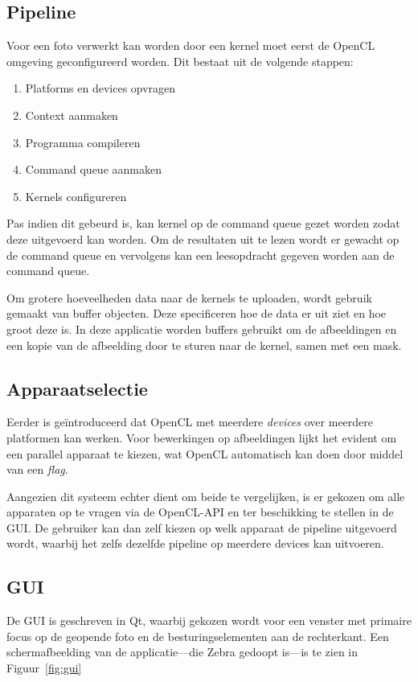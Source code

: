 \documentclass[twocolumn, a4paper]{article}
\begin{document}
\subsection{Pipeline}
Voor een foto verwerkt kan worden door een kernel moet eerst de OpenCL omgeving geconfigureerd worden. Dit bestaat uit de volgende stappen:

\begin{enumerate}
    \item Platforms en devices opvragen 
    \item Context aanmaken
    \item Programma compileren
    \item Command queue aanmaken
    \item Kernels configureren
\end{enumerate}
Pas indien dit gebeurd is, kan kernel op de command queue gezet worden zodat deze uitgevoerd kan worden. Om de resultaten uit te lezen wordt er gewacht op de command queue en vervolgens kan een leesopdracht gegeven worden aan de command queue. 

Om grotere hoeveelheden data naar de kernels te uploaden, wordt gebruik gemaakt van buffer objecten. Deze specificeren hoe de data er uit ziet en hoe groot deze is. In deze applicatie worden buffers gebruikt om de afbeeldingen en een kopie van de afbeelding door te sturen naar de kernel, samen met een mask.

\subsection{Apparaatselectie}
Eerder is geïntroduceerd dat OpenCL met meerdere \emph{devices} over meerdere platformen kan werken. Voor bewerkingen op afbeeldingen lijkt het evident om een parallel apparaat te kiezen, wat OpenCL automatisch kan doen door middel van een \emph{flag}. 

Aangezien dit systeem echter dient om beide te vergelijken, is er gekozen om alle apparaten op te vragen via de OpenCL-API en ter beschikking te stellen in de GUI. De gebruiker kan dan zelf kiezen op welk apparaat de pipeline uitgevoerd wordt, waarbij het zelfs dezelfde pipeline op meerdere devices kan uitvoeren. 

\subsection{GUI}
De GUI is geschreven in Qt, waarbij gekozen wordt voor een venster met primaire focus op de geopende foto en de besturingselementen aan de rechterkant. Een schermafbeelding van de applicatie---die Zebra gedoopt is---is te zien in Figuur~\ref{fig:gui} 
\end{document}
